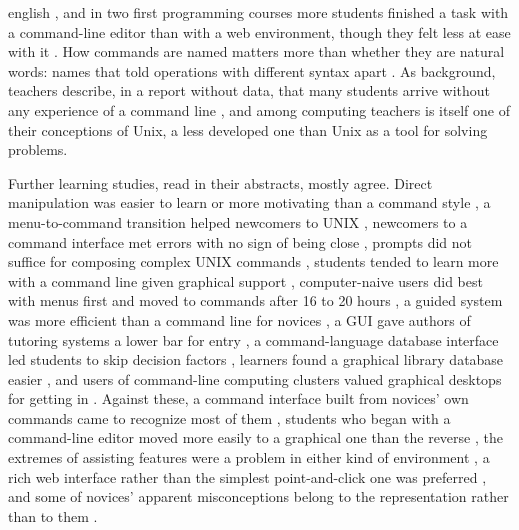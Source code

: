 \begin{onlyin}{english}
\autocite{Reinhard1991Effect}, and in two first programming courses
more students finished a task with a command-line editor than with a
web environment, though they felt less at ease with it
\autocite{Cooper2020Exploring}.  How commands are named matters more
than whether they are natural words: names that told operations with
different syntax apart .  As background, teachers describe, in a report without
data, that many students arrive without any experience of a command line
\autocite{Kendon2016Unix}, and
among computing teachers  is itself one of their conceptions of
Unix, a less developed one than Unix as a tool for solving problems.

Further learning studies, read in their abstracts, mostly agree.
Direct manipulation was easier to learn or more motivating than a
command style
\autocite{Davis1994Effects,Davis2001Mediating,Davis1998Effect,%
Wiedenbeck1997Influence}, a menu-to-command transition helped newcomers
to UNIX \autocite{Badre1991Effects}, newcomers to a command interface
met errors with no sign of being close \autocite{Lewis2003Menus},
prompts did not suffice for composing complex UNIX commands
\autocite{Doane1992Prompt}, students tended to learn more with a command
line given graphical support \autocite{Herrera2005Training},
computer-naive users did best with menus first and moved to commands
after 16 to 20 hours \autocite{Gilfoil1982Warming}, a guided system was
more efficient than a command line for novices
\autocite{Westendorp1997Guided}, a GUI gave authors of tutoring systems
a lower bar for entry \autocite{Devasani2012Evaluation}, a
command-language database interface led students to skip decision
factors \autocite{Chen2001Investigation}, learners found a graphical
library database easier \autocite{Gaff1994Gui}, and users of
command-line computing clusters valued graphical desktops for getting in
\autocite{Thota2019Desktops}.  Against these, a command interface built
from novices' own commands came to recognize most of them
\autocite{Good1984Building}, students who began with a command-line
editor moved more easily to a graphical one than the reverse
\autocite{Dillon2012Mental}, the extremes of assisting features were a
problem in either kind of environment \autocite{Dillon2012Comparing}, a
rich web interface rather than the simplest point-and-click one was
preferred \autocite{MarquezBarja2018Assessing}, and some of novices'
apparent misconceptions belong to the representation rather than to
them \autocite{Masson1988Misconceived}.
\end{onlyin}
